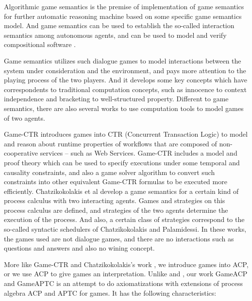 \documentclass{fac}
\begin{document}
Algorithmic game semantics \cite{Algorithm} is the premise of implementation of game semantics for further automatic reasoning machine based on some specific game semantics model. And game semantics can be used to establish the so-called interaction semantics \cite{Interaction} among autonomous agents, and can be used to model and verify compositional software \cite{COMPOSITION1} \cite{COMPOSITION2}.

Game semantics utilizes such dialogue games to model interactions between the system under consideration and the environment, and pays more attention to the playing process of the two players. And it develops some key concepts which have correspondents to traditional computation concepts, such as innocence to context independence and bracketing to well-structured property. Different to game semantics, there are also several works to use computation tools to model games of two agents.

Game-CTR \cite{GameCTR} introduces games into CTR (Concurrent Transaction Logic) to model and reason about runtime properties of workflows that are composed of non-cooperative services -- such as Web Services. Game-CTR includes a model and proof theory which can be used to specify executions under some temporal and causality constraints, and also a game solver algorithm to convert such constraints into other equivalent Game-CTR formulas to be executed more efficiently. Chatzikokolakis et al\cite{GameProcess} develop a game semantics for a certain kind of process calculus with two interacting agents. Games and strategies on this process calculus are defined, and strategies of the two agents determine the execution of the process. And also, a certain class of strategies correspond to the so-called syntactic schedulers of Chatzikokolakis and Palamidessi. In these works, the games used are not dialogue games, and there are no interactions such as questions and answers and also no wining concept.

More like Game-CTR \cite{GameCTR} and Chatzikokolakis's work \cite{GameProcess}, we introduce games into ACP, or we use ACP to give games an interpretation. Unlike \cite{GameCTR} and \cite{GameProcess}, our work GameACP and GameAPTC is an attempt to do axiomatizations with extensions of process algebra ACP and APTC for games. It has the following characteristics:
\end{document}
